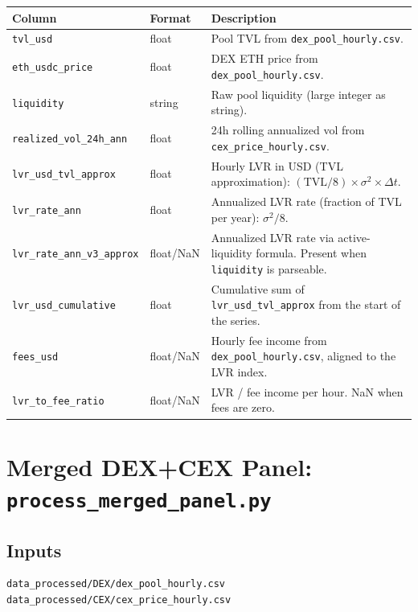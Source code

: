 \documentclass[11pt,a4paper]{article}
\begin{document}
\begin{xltabular}{\linewidth}{L{4.5cm}L{3.0cm}Y}
\toprule
\textbf{Column} & \textbf{Format} & \textbf{Description} \\
\midrule
\texttt{tvl\_usd} & float & Pool TVL from \texttt{dex\_pool\_hourly.csv}. \\
\texttt{eth\_usdc\_price} & float & DEX ETH price from
  \texttt{dex\_pool\_hourly.csv}. \\
\texttt{liquidity} & string & Raw pool liquidity (large integer as string). \\
\texttt{realized\_vol\_24h\_ann} & float & 24h rolling annualized vol from
  \texttt{cex\_price\_hourly.csv}. \\
\texttt{lvr\_usd\_tvl\_approx} & float & Hourly LVR in USD (TVL
  approximation): $(\mathrm{TVL}/8) \times \sigma^2 \times \Delta t$. \\
\texttt{lvr\_rate\_ann} & float & Annualized LVR rate (fraction of TVL
  per year): $\sigma^2/8$. \\
\texttt{lvr\_rate\_ann\_v3\_approx} & float/NaN & Annualized LVR rate via
  active-liquidity formula. Present when \texttt{liquidity} is parseable. \\
\texttt{lvr\_usd\_cumulative} & float & Cumulative sum of
  \texttt{lvr\_usd\_tvl\_approx} from the start of the series. \\
\texttt{fees\_usd} & float/NaN & Hourly fee income from
  \texttt{dex\_pool\_hourly.csv}, aligned to the LVR index. \\
\texttt{lvr\_to\_fee\_ratio} & float/NaN & LVR / fee income per hour.
  NaN when fees are zero. \\
\bottomrule
\end{xltabular}

\section{Merged DEX+CEX Panel: \texttt{process\_merged\_panel.py}}
\label{sec:merged}

\subsection{Inputs}

\begin{lstlisting}
data_processed/DEX/dex_pool_hourly.csv
data_processed/CEX/cex_price_hourly.csv
\end{lstlisting}
\end{document}
